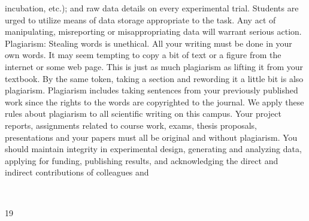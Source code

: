 \documentclass[a4paper,10pt]{article}
\begin{document}
incubation, etc.); and raw data details on every experimental trial. Students are urged to
utilize means of data storage appropriate to the task. Any act of manipulating, misreporting
or misappropriating data will warrant serious action.
Plagiarism: Stealing words is unethical. All your writing must be done in your own words.
It may seem tempting to copy a bit of text or a figure from the internet or some web page.
This is just as much plagiarism as lifting it from your textbook. By the same token, taking a
section and rewording it a little bit is also plagiarism. Plagiarism includes taking sentences
from your previously published work since the rights to the words are copyrighted to the
journal. We apply these rules about plagiarism to all scientific writing on this campus. Your
project reports, assignments related to course work, exams, thesis proposals, presentations
and your papers must all be original and without plagiarism. You should maintain integrity
in experimental design, generating and analyzing data, applying for funding, publishing
results, and acknowledging the direct and indirect contributions of colleagues and
	
  

19	
  
\end{document}
